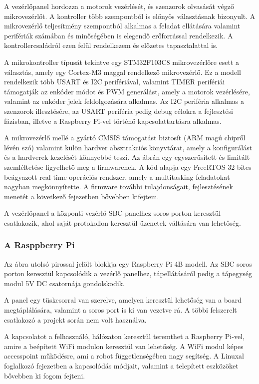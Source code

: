 \medskip

A vezérlőpanel hordozza a motorok vezérlését, és szenzorok olvasását végző
mikrovezérlőt. A kontroller több szempontból is előnyös választásnak bizonyult. A
mikrovezérlő teljesítmény szempontból alkalmas a feladat ellátására valamint
perifériák számában és minőségében is elegendő erőforrással rendelkezik. A
kontrollercsaládról ezen felül rendelkezem és előzetes tapasztalattal is.

A mikrokontroller típusát tekintve egy STM32F103C8 mikrovezérlőre
esett a választás, amely egy Cortex-M3 maggal rendelkező
mikrovezérlő. Ez a modell rendelkezik több USART és I2C perifériával,
valamint TIMER perifériái támogatják az enkóder módot és PWM
generálást, amely a motorok vezérlésére, valamint az enkóder jelek
feldolgozására alkalmas. Az I2C periféria alkalmas a szenzorok
illesztésére, az USART periféria pedig debug célokra a fejlesztési
fázisban, illetve a Raspberry Pi-vel történő kapcsolattartásra
alkalmas\cite{stm32source}.

A mikrovezérlő mellé a gyártó CMSIS támogatást biztosít (ARM magú chipről lévén
szó) valamint külön hardver absztrakciós könyvtárat, amely a konfigurálást és a
hardverek kezelését könnyebbé teszi. Az ábrán egy egyszerűsített és limitált
szemléltetése figyelhető meg a firmwarenek. A kód alapja egy FreeRTOS 32 bites
beágyazott real-time operációs rendszer, amely a multitasking feladatokat nagyban
megkönnyítette. A firmware további tulajdonságait, fejlesztésének menetét a
következő fejezetben bővebben kifejtem.

A vezérlőpanel a központi vezérlő SBC panelhez soros porton keresztül
csatlakozik, ahol saját protokollon keresztül üzenetek váltására van lehetőség. 

\subsubsection{A Rasppberry Pi}

Az ábra utolsó pirossal jelölt blokkja egy Raspberry Pi 4B modell. Az SBC soros
porton keresztül kapcsolódik a vezérlő panelhez, tápellátásáról pedig a tápegység
modul 5V DC csatornája gondolskodik.

A panel egy tüskesorral van szerelve, amelyen keresztül lehetőség van a board
megtáplálására, valamint a soros port is ki van vezetve rá. A többi felszerelt
csatlakozó a projekt során nem volt használva.

\medskip

A kapcsolatot a felhasználó, hálózaton keresztül teremthet a Raspberry Pi-vel,
amire a beépített WiFi modulon keresztül van lehetőség. A WiFi modul képes
accesspoint működésre, ami a robot függetlenségében nagy segítség. A Linuxal
foglalkozó fejezetben a kapcsolódás módjait, valamint a telepített eszközöket
bővebben ki fogom fejteni.

